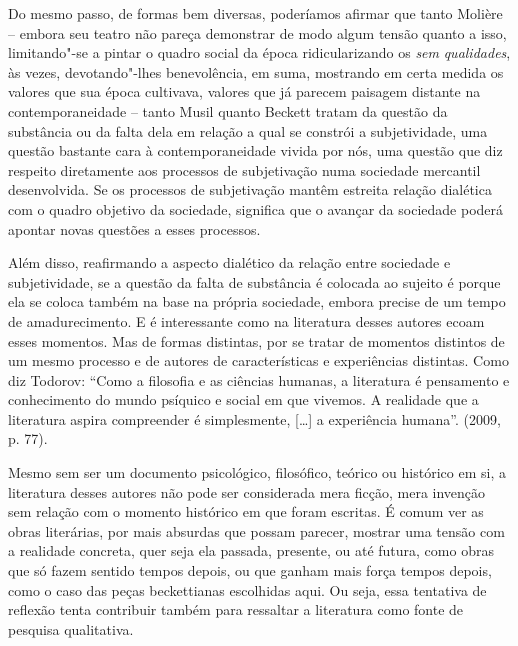 Do mesmo passo, de formas bem diversas, poderíamos afirmar que tanto
Molière -- embora seu teatro não pareça demonstrar de modo algum tensão
quanto a isso, limitando"-se a pintar o quadro social da época
ridicularizando os \emph{sem} \emph{qualidades}, às vezes,
devotando"-lhes benevolência, em suma, mostrando em certa medida os
valores que sua época cultivava, valores que já parecem paisagem
distante na contemporaneidade -- tanto Musil quanto Beckett tratam da
questão da substância ou da falta dela em relação a qual se constrói a
subjetividade, uma questão bastante cara à contemporaneidade vivida por
nós, uma questão que diz respeito diretamente aos processos de
subjetivação numa sociedade mercantil desenvolvida. Se os processos de
subjetivação mantêm estreita relação dialética com o quadro objetivo da
sociedade, significa que o avançar da sociedade poderá apontar novas
questões a esses processos.

Além disso, reafirmando a aspecto dialético da relação entre sociedade e
subjetividade, se a questão da falta de substância é colocada ao sujeito
é porque ela se coloca também na base na própria sociedade, embora
precise de um tempo de amadurecimento. E é interessante como na
literatura desses autores ecoam esses momentos. Mas de formas distintas,
por se tratar de momentos distintos de um mesmo processo e de autores de
características e experiências distintas. Como diz Todorov: ``Como a
filosofia e as ciências humanas, a literatura é pensamento e
conhecimento do mundo psíquico e social em que vivemos. A realidade que
a literatura aspira compreender é simplesmente, [\ldots{}] a experiência
humana''. (2009, p. 77).

Mesmo sem ser um documento psicológico, filosófico, teórico ou histórico
em si, a literatura desses autores não pode ser considerada mera ficção,
mera invenção sem relação com o momento histórico em que foram escritas.
É comum ver as obras literárias, por mais absurdas que possam parecer,
mostrar uma tensão com a realidade concreta, quer seja ela passada,
presente, ou até futura, como obras que só fazem sentido tempos depois,
ou que ganham mais força tempos depois, como o caso das peças
beckettianas escolhidas aqui. Ou seja, essa tentativa de reflexão tenta
contribuir também para ressaltar a literatura como fonte de pesquisa
qualitativa.

